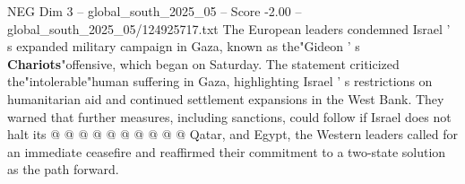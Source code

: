 \begin{textsample}{NEG Dim 3 – global\_south\_2025\_05 – Score -2.00 – global\_south\_2025\_05/124925717.txt}
The European leaders condemned Israel ' s expanded military campaign in Gaza, known as the"Gideon ' s \textbf{Chariots}"offensive, which began on Saturday.
The statement criticized the"intolerable"human suffering in Gaza, highlighting Israel ' s restrictions on humanitarian aid and continued settlement expansions in the West Bank.
They warned that further measures, including sanctions, could follow if Israel does not halt its @ @ @ @ @ @ @ @ @ @ Qatar, and Egypt, the Western leaders called for an immediate ceasefire and reaffirmed their commitment to a two-state solution as the path forward.

\end{textsample}
